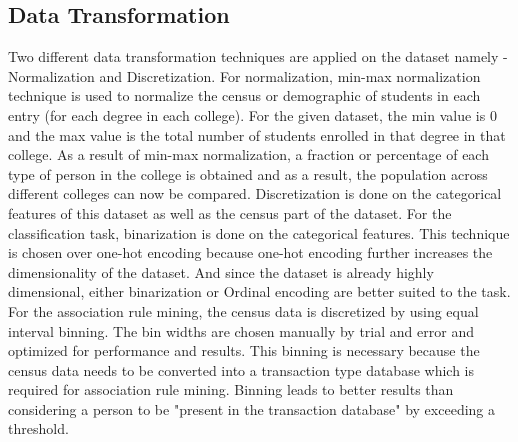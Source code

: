 \subsection{Data Transformation}
Two different data transformation techniques are applied on the dataset namely - Normalization and Discretization. 
For normalization, min-max normalization technique is used to normalize the census or demographic of students in each entry (for each degree in each college). For the given dataset, the min value is 0 and the max value is the total number of students enrolled in that degree in that college. As a result of min-max normalization, a fraction or percentage of each type of person in the college is obtained and as a result, the population across different colleges can now be compared. 
Discretization is done on the categorical features of this dataset as well as the census part of the dataset. For the classification task, binarization is done on the categorical features. This technique is chosen over one-hot encoding because one-hot encoding further increases the dimensionality of the dataset. And since the dataset is already highly dimensional, either binarization or Ordinal encoding are better suited to the task. 
For the association rule mining, the census data is discretized by using equal interval binning. The bin widths are chosen manually by trial and error and optimized for performance and results. This binning is necessary because the census data needs to be converted into a transaction type database which is required for association rule mining. Binning leads to better results than considering a person to be "present in the transaction database" by exceeding a threshold.
